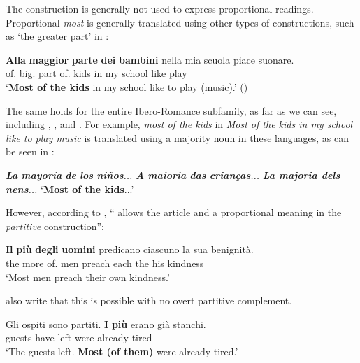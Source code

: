 \documentclass[output=paper
,modfonts
,nonflat]{langsci/langscibook}
\begin{document}
The  construction is generally not used to express proportional readings. Proportional \textit{most} is generally translated using other types of constructions, such as `the greater part' in :

\ea \label{ex:coppockstrand:74} 
\gll \textbf{Alla} \textbf{maggior} \textbf{parte} \textbf{dei} \textbf{bambini} nella mia scuola piace suonare.\\
of. big.\cmpr{} part of. kids in my school like play\\ 
\glt `\textbf{Most of the kids} in my school like to play (music).' \hfill ()
\z

The same holds for the entire Ibero-Romance subfamily, as far as we can see, including , , and . For example,  \textit{most of the kids} in \textit{Most of the kids in my school like to play music} is translated using a majority noun in these languages, as can be seen in :

\ea  \label{ex:coppockstrand:75}
\settowidth{}
\ea \textit{\textbf{La} \textbf{mayoría} \textbf{de} \textbf{los} \textbf{niños}...} 
\ex \textit{\textbf{A} \textbf{maioria} \textbf{das} \textbf{crianças}...} 
\ex \textit{\textbf{La majoria dels nens}...} 
\sn `\textbf{Most of the kids}...'
\z
\z

However, according to \citet[20]{Dobrovie-SorinGiurgea2015}, `` allows the article and a proportional meaning in the \textit{partitive} construction'':

\ea \label{ex:coppockstrand:76}
\gll \textbf{Il} \textbf{pi\`u} \textbf{degli} \textbf{uomini} predicano ciascuno la sua benignit\`a.\\
the more of. men preach each the his kindness\\ 
\glt `Most men preach their own kindness.'
\z

\citet[21]{Dobrovie-SorinGiurgea2015} also write that this is possible with no overt partitive complement.

\ea \label{ex:coppockstrand:77}
\gll Gli ospiti sono partiti. \textbf{I} \textbf{pi\`u} erano gi\`a stanchi.\\
 guests have left  \cmpr{} were already tired\\ 
\glt `The guests left. \textbf{Most (of them)} were already tired.'
\z
\end{document}
